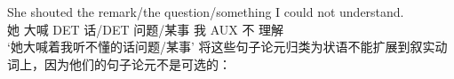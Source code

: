 \ea
\gll She shouted the remark/the question/something I could not understand.\\
她 大喊 DET 话/DET 问题/某事 我 AUX 不 理解\\
\glt `她大喊着我听不懂的话问题/某事'
\z
将这些句子论元归类为状语不能扩展到叙实动词上，因为他们的句子论元不是可选的\citep[]{AG2008a}：

\eal
{}
\zl

